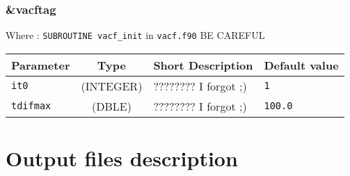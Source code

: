 \documentclass[a4paper]{article}
\begin{document}
\subsubsection{\&vacftag}

Where : \verb?SUBROUTINE vacf_init? in \verb?vacf.f90?
BE CAREFUL
\newline

\begin{longtable}{l|c|m{8cm}|m{2cm}}
\hline
\hline
Parameter        &  Type              &          Short Description                                                          & Default value \\
\hline
\hline
\rule[-0.75cm]{0cm}{1.5cm}
\verb?it0?       & (INTEGER)          & ???????? I forgot ;)                                                                & \verb?1? \\
\hline
\rule[-0.75cm]{0cm}{1.5cm}
\verb?tdifmax?   & (DBLE)             & ???????? I forgot ;)                                                                & \verb?100.0? \\ 
\hline
\hline
\end{longtable}


\section{Output files description}



\end{document}
